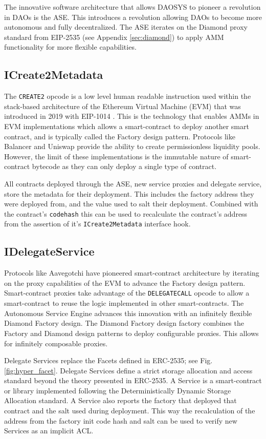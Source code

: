 \documentclass[journal,twocolumn,12pt]{ieeesyscoin}
\begin{document}
The innovative software architecture that allows DAOSYS to pioneer a revolution in DAOs is the ASE. This introduces a revolution allowing DAOs to become more autonomous and fully decentralized. The ASE iterates on the Diamond proxy standard from EIP-2535 (see Appendix \ref{sec:diamond}) to apply AMM functionality for more flexible capabilities.

\subsection{ICreate2Metadata}

The \texttt{CREATE2} opcode is a low level human readable instruction used within the stack-based architecture of the Ethereum Virtual Machine (EVM) that was introduced in 2019 with EIP-1014 \cite{But18}. This is the technology that enables AMMs in EVM implementations which allows a smart-contract to deploy another smart contract, and is typically called the Factory design pattern. Protocols like Balancer and Uniswap provide the ability to create permissionless liquidity pools. However, the limit of these implementations is the immutable nature of smart-contract bytecode as they can only deploy a single type of contract. 

All contracts deployed through the ASE, new service proxies and delegate service, store the metadata for their deployment. This includes the factory address they were deployed from, and the value used to salt their deployment. Combined with the contract’s \texttt{codehash} this can be used to recalculate the contract’s address from the assertion of it’s \texttt{ICreate2Metadata} interface hook.

\subsection{IDelegateService}

Protocols like Aavegotchi have pioneered smart-contract architecture by iterating on the proxy capabilities of the EVM to advance the Factory design pattern. Smart-contract proxies take advantage of the \texttt{DELEGATECALL} opcode to allow a smart-contract to reuse the logic implemented in other smart-contracts. The Autonomous Service Engine advances this innovation with an infinitely flexible Diamond Factory design. The Diamond Factory design factory combines the Factory and Diamond design patterns to deploy configurable proxies. This allows for infinitely composable proxies.

Delegate Services replace the Facets defined in ERC-2535; see Fig. \ref{fig:hyper_facet}. Delegate Services define a strict storage allocation and access standard beyond the theory presented in ERC-2535. A Service is a smart-contract or library implemented following the Deterministically Dynamic Storage Allocation standard. A Service also reports the factory that deployed that contract and the salt used during deployment. This way the recalculation of the address from the factory init code hash and salt can be used to verify new Services as an implicit ACL.
\end{document}
